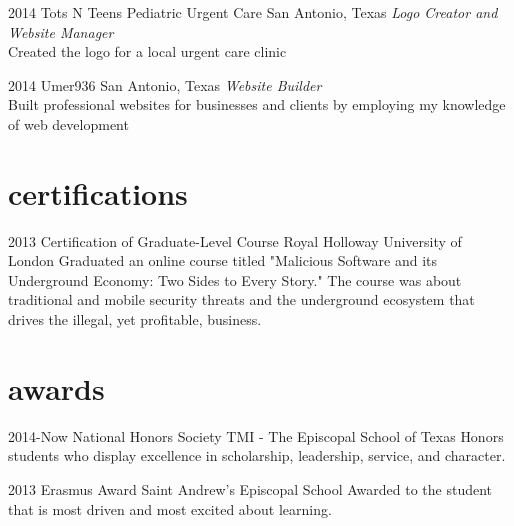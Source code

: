 \documentclass[]{friggeri-cv} %
\begin{document}
\begin{entrylist}

\entry
{2014}
{Tots N Teens Pediatric Urgent Care}
{San Antonio, Texas}
{\emph{Logo Creator and Website Manager} \\
	Created the logo for a local urgent care clinic}


\entry
{2014}
{Umer936}
{San Antonio, Texas}
{\emph{Website Builder} \\
	Built professional websites for businesses and clients by employing my knowledge of web development}

	
\end{entrylist}


\section{certifications}

\begin{entrylist}


\entry
{2013}
{Certification of Graduate-Level Course}
{Royal Holloway University of London}
{Graduated an online course titled "Malicious Software and its Underground Economy: Two Sides to Every Story." The course was about traditional and mobile security threats and the underground ecosystem that drives the illegal, yet profitable, business.}


\end{entrylist} 

\section{awards}

\begin{entrylist}


\entry
{2014-Now}
{National Honors Society}
{TMI - The Episcopal School of Texas}
{Honors students who display excellence in scholarship, leadership, service, and character.}


\entry
{2013}
{Erasmus Award}
{Saint Andrew's Episcopal School}
{Awarded to the student that is most driven and most excited about learning.}


\end{entrylist}
\end{document}
